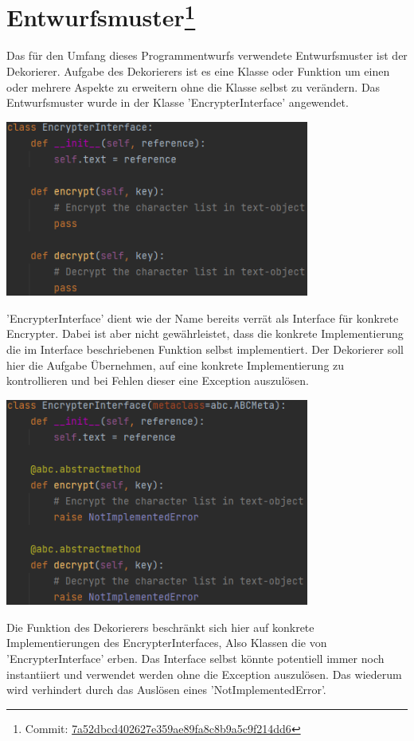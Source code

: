 \documentclass[12pt]{article}
\begin{document}
\section[Entwurfsmuster]{Entwurfsmuster\protect\footnote{Commit: \href{https://github.com/NicoSchrodt/EncryptionService/commit/7a52dbcd402627e359ae89fa8c8b9a5c9f214dd6}{7a52dbcd402627e359ae89fa8c8b9a5c9f214dd6}}}
\label{Entwurfsmuster}
Das für den Umfang dieses Programmentwurfs verwendete Entwurfsmuster ist der Dekorierer. Aufgabe des Dekorierers ist es eine Klasse oder Funktion um einen oder mehrere Aspekte zu erweitern ohne die Klasse selbst zu verändern. Das Entwurfsmuster wurde in der Klasse 'EncrypterInterface' angewendet.
\begin{center}
	\includegraphics[width=10cm]{bilder/Decorator_before.png}
\end{center}
'EncrypterInterface' dient wie der Name bereits verrät als Interface für konkrete Encrypter. Dabei ist aber nicht gewährleistet, dass die konkrete Implementierung die im Interface beschriebenen Funktion selbst implementiert. Der Dekorierer soll hier die Aufgabe Übernehmen, auf eine konkrete Implementierung zu kontrollieren und bei Fehlen dieser eine Exception auszulösen.
\begin{center}
	\includegraphics[width=10cm]{bilder/Decorator_after.png}
\end{center}
Die Funktion des Dekorierers beschränkt sich hier auf konkrete Implementierungen des EncrypterInterfaces, Also Klassen die von 'EncrypterInterface' erben. Das Interface selbst könnte potentiell immer noch instantiiert und verwendet werden ohne die Exception auszulösen. Das wiederum wird verhindert durch das Auslösen eines 'NotImplementedError'.
\end{document}
